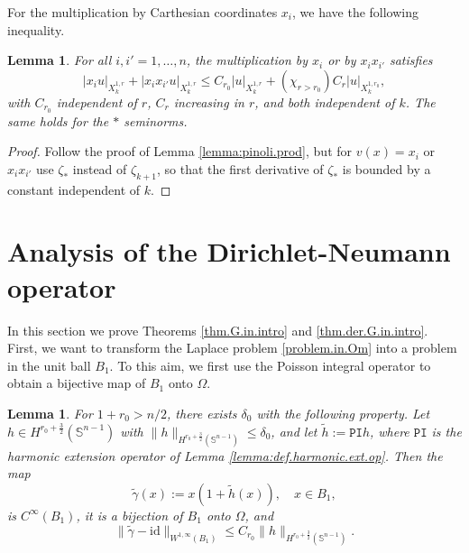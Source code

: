 \documentclass[10pt,reqno,a4paper]{article}
\numberwithin{equation}{section}
\theoremstyle{plain}
\newtheorem{lemma}[theorem]{Lemma}
\theoremstyle{definition}
\renewcommand{\S}{{\mathbb S}}
\newcommand{\Om}{\Omega}
\begin{document}
For the multiplication by Carthesian coordinates $x_i$, we have the following inequality. 

\begin{lemma} 
For all $i,i'=1, \ldots, n$, the multiplication by $x_i$ or by $x_i x_{i'}$ satisfies 
\begin{equation} \label{pinoli.prod.x.i}
|x_i u|_{X^{1,r}_k} + |x_i x_{i'} u|_{X^{1,r}_k} 
\leq C_{r_0} |u|_{X^{1,r}_k} 
+ (\chi_{r > r_0}) C_r |u|_{X^{1,r_0}_k},
\end{equation}
with $C_{r_0}$ independent of $r$, 
$C_r$ increasing in $r$, 
and both independent of $k$. 
The same holds for the $*$ seminorms. 
\end{lemma}


\begin{proof}
Follow the proof of Lemma \ref{lemma:pinoli.prod}, 
but for $v(x)=x_i$ or $x_i x_{i'}$ use $\zeta_*$ instead of $\zeta_{k+1}$, 
so that the first derivative of $\zeta_*$ is bounded by a constant 
independent of $k$.  
\end{proof}





\section{Analysis of the Dirichlet-Neumann operator}
\label{sec:DN}

In this section we prove Theorems \ref{thm.G.in.intro} and \ref{thm.der.G.in.intro}.
First, we want to transform the Laplace problem \eqref{problem.in.Om} into a problem in the unit ball $B_1$.
To this aim, we first use the Poisson integral operator to obtain a bijective map of $B_1$ onto $\Om$. 

\begin{lemma} \label{lemma:tilde.gamma}
For $1+r_0>n/2$, there exists $\delta_0$ with the following property.  
Let $h \in H^{r_0+\frac32}(\S^{n-1})$ with $\| h \|_{H^{r_0+\frac32}(\S^{n-1})} \leq \delta_0$, 
and let $\tilde h := \mathtt{PI} h$, where $\mathtt{PI}$ is the harmonic extension operator of 
Lemma \ref{lemma:def.harmonic.ext.op}. 
Then the map 
\begin{equation} \label{def.tilde.gamma}
\tilde \gamma(x) := x(1 + \tilde h(x)), \quad x \in B_1,
\end{equation}
is $C^\infty(B_1)$, it is a bijection of $B_1$ onto $\Om$, and 
\begin{equation} \label{est.tilde.gamma.id}
\| \tilde \gamma - \mathrm{id} \|_{W^{1,\infty}(B_1)} 
\leq C_{r_0} \| h \|_{H^{r_0+\frac32}(\S^{n-1})}.
\end{equation}
\end{lemma}
\end{document}
